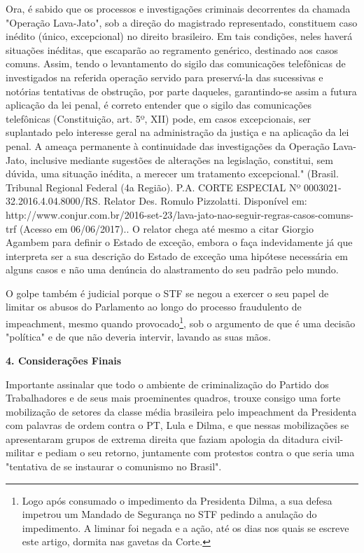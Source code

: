 {  Ora, é sabido que os processos e investigações criminais decorrentes
  da chamada "Operação Lava-Jato", sob a direção do magistrado
  representado, constituem caso inédito (único, excepcional) no direito
  brasileiro. Em tais condições, neles haverá situações inéditas, que
  escaparão ao regramento genérico, destinado aos casos comuns. Assim,
  tendo o levantamento do sigilo das comunicações telefônicas de
  investigados na referida operação servido para preservá-la das
  sucessivas e notórias tentativas de obstrução, por parte daqueles,
  garantindo-se assim a futura aplicação da lei penal, é correto
  entender que o sigilo das comunicações telefônicas (Constituição, art.
  5º, XII) pode, em casos excepcionais, ser suplantado pelo interesse
  geral na administração da justiça e na aplicação da lei penal. A
  ameaça permanente à continuidade das investigações da Operação
  Lava-Jato, inclusive mediante sugestões de alterações na legislação,
  constitui, sem dúvida, uma situação inédita, a merecer um tratamento
  excepcional." (Brasil. Tribunal Regional Federal (4a Região). P.A.
  CORTE ESPECIAL Nº 0003021-32.2016.4.04.8000/RS. Relator Des. Romulo
  Pizzolatti. Disponível em:
  http://www.conjur.com.br/2016-set-23/lava-jato-nao-seguir-regras-casos-comuns-trf
  (Acesso em 06/06/2017).}. O relator chega até mesmo a citar Giorgio
Agambem para definir o Estado de exceção, embora o faça indevidamente já
que interpreta ser a sua descrição do Estado de exceção uma hipótese
necessária em alguns casos e não uma denúncia do alastramento do seu
padrão pelo mundo.

O golpe também é judicial porque o STF se negou a exercer o seu papel de
limitar os abusos do Parlamento ao longo do processo fraudulento de
impeachment, mesmo quando provocado\footnote{Logo após consumado o
  impedimento da Presidenta Dilma, a sua defesa impetrou um Mandado de
  Segurança no STF pedindo a anulação do impedimento. A liminar foi
  negada e a ação, até os dias nos quais se escreve este artigo, dormita
  nas gavetas da Corte.}, sob o argumento de que é uma decisão
"política" e de que não deveria intervir, lavando as suas mãos.

\textbf{4. Considerações Finais}

Importante assinalar que todo o ambiente de criminalização do Partido
dos Trabalhadores e de seus mais proeminentes quadros, trouxe consigo
uma forte mobilização de setores da classe média brasileira pelo
impeachment da Presidenta com palavras de ordem contra o PT, Lula e
Dilma, e que nessas mobilizações se apresentaram grupos de extrema
direita que faziam apologia da ditadura civil-militar e pediam o seu
retorno, juntamente com protestos contra o que seria uma "tentativa de
se instaurar o comunismo no Brasil".

